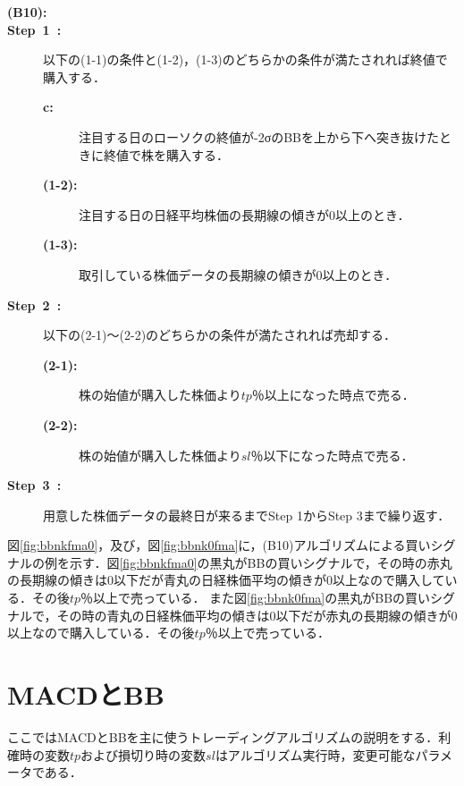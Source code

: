   \begin{description}
    \item[\textbf{(B10):}]
    \item[\textbf{Step~1~:}]以下の(1-1)の条件と(1-2)，(1-3)のどちらかの条件が満たされれば終値で購入する．
    \begin{description}
      \item[\textbf{c:}]注目する日のローソクの終値が-2σのBBを上から下へ突き抜けたときに終値で株を購入する．
      \item[\textbf{(1-2):}]注目する日の日経平均株価の長期線の傾きが0以上のとき．
      \item[\textbf{(1-3):}]取引している株価データの長期線の傾きが0以上のとき． 

     \end{description}  
    
    
    \item[\textbf{Step~2~:}]以下の(2-1)～(2-2)のどちらかの条件が満たされれば売却する．
     \begin{description}
      \item[\textbf{(2-1):}]株の始値が購入した株価より$tp$％以上になった時点で売る．
      \item[\textbf{(2-2):}]株の始値が購入した株価より$sl$％以下になった時点で売る． 
     \end{description}
    \item[\textbf{Step~3~:}]用意した株価データの最終日が来るまでStep 1からStep 3まで繰り返す．
    \end{description}
    
     図\ref{fig:bbnkfma0}，及び，図\ref{fig:bbnk0fma}に，(B10)アルゴリズムによる買いシグナルの例を示す．図\ref{fig:bbnkfma0}の黒丸がBBの買いシグナルで，その時の赤丸の長期線の傾きは0以下だが青丸の日経株価平均の傾きが0以上なので購入している．その後$tp$％以上で売っている．
 また図\ref{fig:bbnk0fma}の黒丸がBBの買いシグナルで，その時の青丸の日経株価平均の傾きは0以下だが赤丸の長期線の傾きが0以上なので購入している．その後$tp$％以上で売っている．
\section{MACDとBB}
ここではMACDとBBを主に使うトレーディングアルゴリズムの説明をする．利確時の変数$tp$および損切り時の変数$sl$はアルゴリズム実行時，変更可能なパラメータである．
